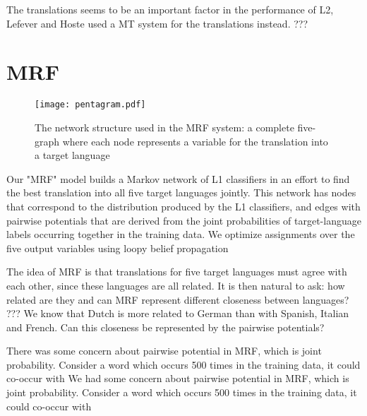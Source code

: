 \documentclass[11pt,letterpaper]{article}
\begin{document}
The translations seems to be an important factor in the performance of L2,
Lefever and Hoste used a MT system for the translations instead.
???


\section{MRF}
\begin{figure}
  \begin{center}
  \texttt{[image: pentagram.pdf]}
  \end{center}
  \label{pentagram}
  \caption{The network structure used in the MRF system: a complete five-graph
  where each node represents a variable for the translation into a target
language}
\end{figure}
Our "MRF" model builds a Markov network of L1 classifiers in an effort to find
the best translation into all five target languages jointly. This network has
nodes that correspond to the distribution produced by the L1 classifiers, and
edges with pairwise potentials that are derived from the joint probabilities of
target-language labels occurring together in the training data. We optimize
assignments over the five output variables using loopy belief propagation

The idea of MRF is that translations for five target languages must agree with
each other, since these languages are all related.  It is then natural to ask:
how related are they and can MRF represent different closeness between
languages?  ???  We know that Dutch is more related to German than with
Spanish, Italian and French. Can this closeness be represented by the pairwise
potentials?


There was some concern about pairwise potential in MRF, which is joint probability. Consider a word which occurs 500 times in the training data, it could co-occur with
We had some concern about pairwise potential in MRF, which is joint
probability. Consider a word which occurs 500 times in the training data, it
could co-occur with
\end{document}
